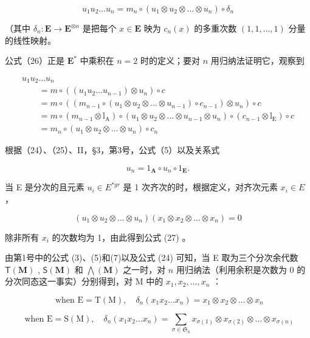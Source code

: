 \[
u _ {1} u _ {2} \dots u _ {n} = m _ {n} \circ (u _ {1} \otimes u _ {2} \otimes \dots \otimes u _ {n}) \circ \delta_ {n}\tag{27}
\]

（其中 \(\delta_n: \mathbf{E} \to \mathbf{E}^{\otimes n}\) 是把每个 \(x \in \mathbf{E}\) 映为 \(c_n(x)\) 的多重次数 \((1, 1, \ldots, 1)\) 分量的线性映射。

公式（26）正是 \(\mathbf{E}^*\) 中乘积在 \(n = 2\) 时的定义；要对 \(n\) 用归纳法证明它，观察到

\[
\begin{array}{l} u _ {1} u _ {2} \dots u _ {n} \\ \qquad = m \circ ((u _ {1} u _ {2} \dots u _ {n - 1}) \otimes u _ {n}) \circ c \\ \qquad = m \circ ((m _ {n - 1} \circ (u _ {1} \otimes u _ {2} \otimes \dots \otimes u _ {n - 1}) \circ c _ {n - 1}) \otimes u _ {n}) \circ c \\ \qquad = m \circ (m _ {n - 1} \otimes \mathrm{l} _ {\mathrm{A}}) \circ (u _ {1} \otimes u _ {2} \otimes \dots \otimes u _ {n - 1} \otimes u _ {n}) \circ (c _ {n - 1} \otimes \mathrm{l} _ {\mathrm{E}}) \circ c \\ \qquad = m _ {n} \circ (u _ {1} \otimes u _ {2} \otimes \dots \otimes u _ {n}) \circ c _ {n} \end{array}
\]

根据（24）、（25）、II，§3，第3号，公式（5）以及关系式

\[
u _ {n} = 1 _ {\mathbf {A}} \circ u _ {n} \circ 1 _ {\mathbf {E}}.
\]

当 E 是分次的且元素 \(u_{i} \in E^{*gr}\) 是 1 次齐次的时，根据定义，对齐次元素 \(x_{i} \in E\) ，

\[
(u _ {1} \otimes u _ {2} \otimes \dots \otimes u _ {n}) (x _ {1} \otimes x _ {2} \otimes \dots \otimes x _ {n}) = 0
\]

除非所有 \(x_{i}\) 的次数均为 1，由此得到公式 (27) 。

由第1号中的公式 (3)、(5)和(7)以及公式 (24) 可知，当 E 取为三个分次余代数 \(\mathsf{T}(\mathbf{M})\) , \(\mathsf{S}(\mathbf{M})\) 和 \(\bigwedge (\mathbf{M})\) 之一时，对 \(n\) 用归纳法（利用余积是次数为 0 的分次同态这一事实）分别得到，对 M 中的 \(x_{1}, x_{2}, \ldots, x_{n}\) ：

\[
\text { when   } \mathrm{E} = \mathrm{T} (\mathrm{M}), \quad \delta_ {n} (x _ {1} x _ {2} \dots x _ {n}) = x _ {1} \otimes x _ {2} \otimes \dots \otimes x _ {n}
\]

\[
\text { when } \mathrm{E} = \mathrm{S(M)}, \quad \delta_ {n} (x _ {1} x _ {2} \dots x _ {n}) = \sum_ {\sigma \in \mathfrak {S} _ {n}} x _ {\sigma (1)} \otimes x _ {\sigma (2)} \otimes \dots \otimes x _ {\sigma (n)}
\]

